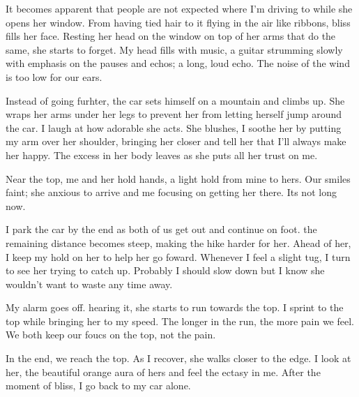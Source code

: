 		It becomes apparent that people are not expected where I'm driving to while she opens her window. From having tied hair to it flying in the air like
	ribbons, bliss fills her face. Resting her head on the window on top of her arms that do the same, she starts to forget. My head fills with music, a guitar
	strumming slowly with emphasis on the pauses and echos; a long, loud echo. The noise of the wind is too low for our ears.

		Instead of going furhter, the car sets himself on a mountain and climbs up. She wraps her arms under her legs to prevent her from letting herself jump
	around the car. I laugh at how adorable she acts. She blushes, I soothe her by putting my arm over her shoulder, bringing her closer and tell her that I'll
	always make her happy. The excess in her body leaves as she puts all her trust on me.

		Near the top, me and her hold hands, a light hold from mine to hers. Our smiles faint; she anxious to arrive and me focusing on getting her there. Its
	not long now.

		I park the car by the end as both of us get out and continue on foot. the remaining distance becomes steep, making the hike harder for her. Ahead of 
	her, I keep my hold on her to help her go foward. Whenever I feel a slight tug, I turn to see her trying to catch up. Probably I should slow down but I know
	she wouldn't want to waste any time away.

		My alarm goes off. hearing it, she starts to run towards the top. I sprint to the top while bringing her to my speed. The longer in the run, the more
	pain we feel. We both keep our foucs on the top, not the pain.

		In the end, we reach the top. As I recover, she walks closer to the edge. I look at her, the beautiful orange aura of hers and feel the ectasy in me.
	After the moment of bliss, I go back to my car alone.
		
